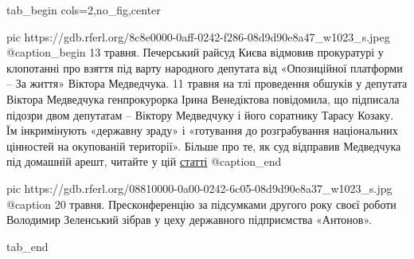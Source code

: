  
 
 
 
 


\ifcmt
  tab_begin cols=2,no_fig,center

		pic https://gdb.rferl.org/8c8e0000-0aff-0242-f286-08d9d90e8a47_w1023_s.jpeg
		@caption_begin
13 травня. Печерський райсуд Києва відмовив прокуратурі у клопотанні про взяття
під варту народного депутата від «Опозиційної платформи – За життя» Віктора
Медведчука. 11 травня на тлі проведення обшуків у депутата Віктора Медведчука генпрокурорка
Ірина Венедіктова повідомила, що підписала підозри двом депутатам – Віктору
Медведчуку і його соратнику Тарасу Козаку. Їм інкримінують «державну зраду» і
«готування до розграбування національних цінностей на окупованій території».
Більше про те, як суд відправив Медведчука під домашній арешт, читайте у цій
\href{https://www.radiosvoboda.org/a/news-sud-medvedchuk/31253770.html}{статті}
		@caption_end

		pic https://gdb.rferl.org/08810000-0a00-0242-6c05-08d9d90e8a37_w1023_s.jpg
		@caption 20 травня. Пресконференцію за підсумками другого року своєї роботи Володимир Зеленський зібрав у цеху державного підприємства «Антонов».

  tab_end
\fi


 
